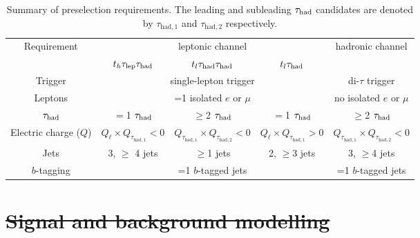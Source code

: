 \documentclass[PAPER, coverpage, atlasdraft=true, texlive=2016, UKenglish]{\ATLASLATEXPATH atlasdoc}
\providecommand{\DIFadd}[1]{{\protect\color{blue}\uwave{#1}}} %
\providecommand{\DIFdel}[1]{{\protect\color{red}\sout{#1}}}                      %
\providecommand{\DIFdelbegin}{} %
\providecommand{\DIFdelend}{} %
\providecommand{\DIFaddFL}[1]{\DIFadd{#1}} %
\providecommand{\DIFaddbeginFL}{} %
\providecommand{\DIFaddendFL}{} %
\providecommand{\DIFdelbeginFL}{} %
\providecommand{\DIFdelendFL}{} %
\begin{document}
\begin{table}[t!]
\caption{\DIFdelbeginFL %
\DIFdelendFL \DIFaddbeginFL \small{Summary of preselection requirements. 
The leading and subleading $\tau_{\mathrm{had}}$ candidates are denoted by $\tau_{\mathrm{had,1}}$ and $\tau_{\mathrm{had,2}}$ respectively.}\DIFaddendFL }
\begin{center}
\begin{tabular}{c|ccc|c}
\toprule\toprule
\multirow{2}{*}{Requirement} &  \multicolumn{3}{c|}{leptonic channel}  & \multirow{2}{*}{hadronic channel} \\ 
& $t_h\tau_{\mathrm{lep}} \tau_{\mathrm{had}}$ & $t_l\tau_{\mathrm{had}} \tau_{\mathrm{had}}$ &  $t_l\tau_{\mathrm{had}}$ & \DIFaddbeginFL \DIFaddFL{$t_h\hadhad$}\DIFaddendFL \\
\midrule
Trigger & \multicolumn{3}{c|}{single-lepton trigger} & di-$\tau$ trigger  \\
Leptons  & \multicolumn{3}{c|}{=1 isolated $e$ or $\mu$}  & no isolated $e$ or $\mu$ \\
$\tau_{\mathrm{had}}$  & $=$1 $\tau_{\mathrm{had}}$ & $\geq$2 $\tau_{\mathrm{had}}$ & $=$1 $\tau_{\mathrm{had}}$ & $\geq$2 $\tau_{\mathrm{had}}$ \\
Electric charge ($Q$) & $Q_\ell \times Q_{\tau_{\mathrm{had,1}}} < 0$ & $Q_{\tau_{\mathrm{had,1}}} \times Q_{\tau_{\mathrm{had,2}}} < 0$ & $Q_\ell \times Q_{\tau_{\mathrm{had,1}}} > 0$ & $Q_{\tau_{\mathrm{had,1}}} \times Q_{\tau_{\mathrm{had,2}}} < 0$ \\
Jets  &  3, $\geq$ 4 jets & $\geq$1 jets & 2, $\geq$3 jets & 3, $\geq$4 jets \\
$b$-tagging & \multicolumn{3}{c|}{=1 $b$-tagged jets} & =1 $b$-tagged jets\\
\bottomrule\bottomrule
\end{tabular}
\label{tab:preselection}
\end{center}
\end{table}


\DIFdelbegin \section{\DIFdel{Signal and background modelling}}
\addtocounter{section}{-1}%
\DIFdelend %
\DIFdelbegin %
\end{document}
